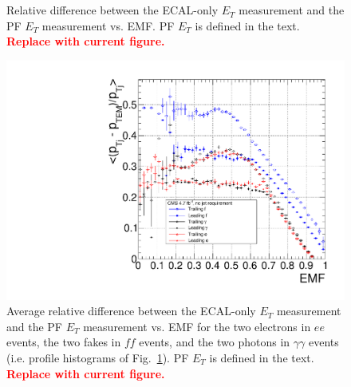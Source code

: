 \documentclass[dissertation.tex]{subfiles}
\begin{document}
\begin{figure}
	\centering
	\hspace{1cm}
	\\
	\hspace{1cm}
	\\
	\hspace{1cm}
	\caption{Relative difference between the ECAL-only $E_{T}$ measurement and the PF $E_{T}$ measurement vs. EMF.  PF $E_{T}$ is defined in the text.  \textcolor{red}{\textbf{Replace with current figure.}}}
	\label{fig:ET_bias_vs_EMF}
\end{figure}

\begin{figure}
	\centering
	\includegraphics[scale=0.5]{4684pb-1_single_ETBias}
	\caption{Average relative difference between the ECAL-only $E_{T}$ measurement and the PF $E_{T}$ measurement vs. EMF for the two electrons in $ee$ events, the two fakes in $\mathit{ff}$ events, and the two photons in $\gamma\gamma$ events (i.e. profile histograms of Fig.~\ref{fig:ET_bias_vs_EMF}).  PF $E_{T}$ is defined in the text.  \textcolor{red}{\textbf{Replace with current figure.}}}
	\label{fig:4684pb-1_single_ETBias}
\end{figure}
\end{document}
